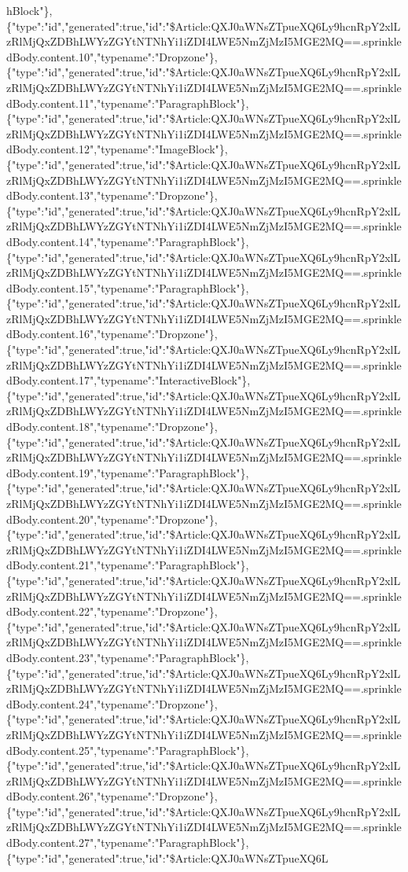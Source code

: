 hBlock"\},\{"type":"id","generated":true,"id":"\$Article:QXJ0aWNsZTpueXQ6Ly9hcnRpY2xlLzRlMjQxZDBhLWYzZGYtNTNhYi1iZDI4LWE5NmZjMzI5MGE2MQ==.sprinkledBody.content.10","typename":"Dropzone"\},\{"type":"id","generated":true,"id":"\$Article:QXJ0aWNsZTpueXQ6Ly9hcnRpY2xlLzRlMjQxZDBhLWYzZGYtNTNhYi1iZDI4LWE5NmZjMzI5MGE2MQ==.sprinkledBody.content.11","typename":"ParagraphBlock"\},\{"type":"id","generated":true,"id":"\$Article:QXJ0aWNsZTpueXQ6Ly9hcnRpY2xlLzRlMjQxZDBhLWYzZGYtNTNhYi1iZDI4LWE5NmZjMzI5MGE2MQ==.sprinkledBody.content.12","typename":"ImageBlock"\},\{"type":"id","generated":true,"id":"\$Article:QXJ0aWNsZTpueXQ6Ly9hcnRpY2xlLzRlMjQxZDBhLWYzZGYtNTNhYi1iZDI4LWE5NmZjMzI5MGE2MQ==.sprinkledBody.content.13","typename":"Dropzone"\},\{"type":"id","generated":true,"id":"\$Article:QXJ0aWNsZTpueXQ6Ly9hcnRpY2xlLzRlMjQxZDBhLWYzZGYtNTNhYi1iZDI4LWE5NmZjMzI5MGE2MQ==.sprinkledBody.content.14","typename":"ParagraphBlock"\},\{"type":"id","generated":true,"id":"\$Article:QXJ0aWNsZTpueXQ6Ly9hcnRpY2xlLzRlMjQxZDBhLWYzZGYtNTNhYi1iZDI4LWE5NmZjMzI5MGE2MQ==.sprinkledBody.content.15","typename":"ParagraphBlock"\},\{"type":"id","generated":true,"id":"\$Article:QXJ0aWNsZTpueXQ6Ly9hcnRpY2xlLzRlMjQxZDBhLWYzZGYtNTNhYi1iZDI4LWE5NmZjMzI5MGE2MQ==.sprinkledBody.content.16","typename":"Dropzone"\},\{"type":"id","generated":true,"id":"\$Article:QXJ0aWNsZTpueXQ6Ly9hcnRpY2xlLzRlMjQxZDBhLWYzZGYtNTNhYi1iZDI4LWE5NmZjMzI5MGE2MQ==.sprinkledBody.content.17","typename":"InteractiveBlock"\},\{"type":"id","generated":true,"id":"\$Article:QXJ0aWNsZTpueXQ6Ly9hcnRpY2xlLzRlMjQxZDBhLWYzZGYtNTNhYi1iZDI4LWE5NmZjMzI5MGE2MQ==.sprinkledBody.content.18","typename":"Dropzone"\},\{"type":"id","generated":true,"id":"\$Article:QXJ0aWNsZTpueXQ6Ly9hcnRpY2xlLzRlMjQxZDBhLWYzZGYtNTNhYi1iZDI4LWE5NmZjMzI5MGE2MQ==.sprinkledBody.content.19","typename":"ParagraphBlock"\},\{"type":"id","generated":true,"id":"\$Article:QXJ0aWNsZTpueXQ6Ly9hcnRpY2xlLzRlMjQxZDBhLWYzZGYtNTNhYi1iZDI4LWE5NmZjMzI5MGE2MQ==.sprinkledBody.content.20","typename":"Dropzone"\},\{"type":"id","generated":true,"id":"\$Article:QXJ0aWNsZTpueXQ6Ly9hcnRpY2xlLzRlMjQxZDBhLWYzZGYtNTNhYi1iZDI4LWE5NmZjMzI5MGE2MQ==.sprinkledBody.content.21","typename":"ParagraphBlock"\},\{"type":"id","generated":true,"id":"\$Article:QXJ0aWNsZTpueXQ6Ly9hcnRpY2xlLzRlMjQxZDBhLWYzZGYtNTNhYi1iZDI4LWE5NmZjMzI5MGE2MQ==.sprinkledBody.content.22","typename":"Dropzone"\},\{"type":"id","generated":true,"id":"\$Article:QXJ0aWNsZTpueXQ6Ly9hcnRpY2xlLzRlMjQxZDBhLWYzZGYtNTNhYi1iZDI4LWE5NmZjMzI5MGE2MQ==.sprinkledBody.content.23","typename":"ParagraphBlock"\},\{"type":"id","generated":true,"id":"\$Article:QXJ0aWNsZTpueXQ6Ly9hcnRpY2xlLzRlMjQxZDBhLWYzZGYtNTNhYi1iZDI4LWE5NmZjMzI5MGE2MQ==.sprinkledBody.content.24","typename":"Dropzone"\},\{"type":"id","generated":true,"id":"\$Article:QXJ0aWNsZTpueXQ6Ly9hcnRpY2xlLzRlMjQxZDBhLWYzZGYtNTNhYi1iZDI4LWE5NmZjMzI5MGE2MQ==.sprinkledBody.content.25","typename":"ParagraphBlock"\},\{"type":"id","generated":true,"id":"\$Article:QXJ0aWNsZTpueXQ6Ly9hcnRpY2xlLzRlMjQxZDBhLWYzZGYtNTNhYi1iZDI4LWE5NmZjMzI5MGE2MQ==.sprinkledBody.content.26","typename":"Dropzone"\},\{"type":"id","generated":true,"id":"\$Article:QXJ0aWNsZTpueXQ6Ly9hcnRpY2xlLzRlMjQxZDBhLWYzZGYtNTNhYi1iZDI4LWE5NmZjMzI5MGE2MQ==.sprinkledBody.content.27","typename":"ParagraphBlock"\},\{"type":"id","generated":true,"id":"\$Article:QXJ0aWNsZTpueXQ6L